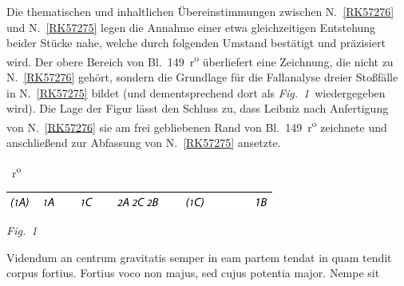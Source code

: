 \begin{ledgroup}
%
%
\pend
%
\pstart
Die thematischen und inhaltlichen Übereinstimmungen zwischen N.~\ref{RK57276} und N.~\ref{RK57275} 
legen die Annahme einer etwa gleichzeitigen Entstehung beider Stücke nahe,
%
welche durch folgenden Umstand bestätigt und präzisiert wird.
%
Der obere Bereich von Bl.~149~r\textsuperscript{o} überliefert eine Zeichnung, die nicht zu N.~\ref{RK57276} gehört, sondern
%
die Grundlage für die Fallanalyse dreier Stoßfälle in N.~\ref{RK57275} bildet
%
(und dementsprechend dort als \lbrack\textit{Fig.~1}\rbrack\ wiedergegeben wird).
%
Die Lage der Figur lässt den Schluss zu, dass Leibniz nach Anfertigung von N.~\ref{RK57276} 
%
sie am frei gebliebenen Rand von Bl.~149~r\textsuperscript{o} zeichnete und anschließend
%
zur Abfassung von N.~\ref{RK57275} ansetzte.
\pend
\end{ledgroup}
%
\newpage
%
\frenchspacing
\vspace{8mm}
\pstart%
\normalsize%
\noindent%
~r\textsuperscript{o}\rbrack\ \pend
\vspace{1.0em} 
  \centerline{\includegraphics[width=0.66\textwidth]{gesamttex/edit_VIII,3/images/LH_37_05_148-149_d1_149r.pdf}} 
    \vspace{0.5em}
\centerline{\lbrack\textit{Fig.~1}\rbrack}
  \vspace{1.5em}
\pstart \noindent
%
Videndum an centrum gravitatis\protect{} semper in eam partem tendat  in quam tendit corpus 
%
fortius\protect{}. Fortius
%
voco non majus\protect{}, sed cujus potentia\protect{} major. Nempe sit  
%
%
\protect\rule[0cm]{0mm}{12pt}%

